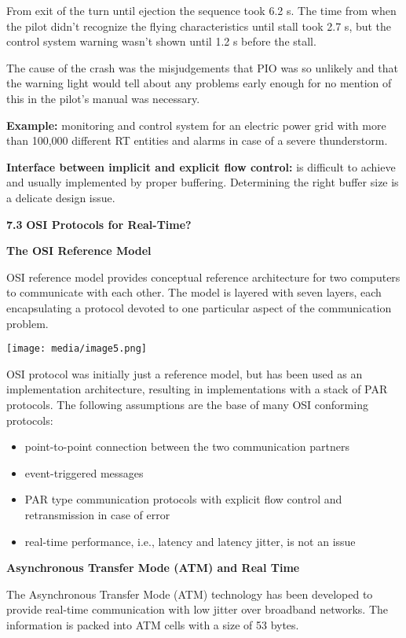 From exit of the turn until ejection the sequence took 6.2 s. The time
from when the pilot didn't recognize the flying characteristics until
stall took 2.7 s, but the control system warning wasn't shown until 1.2
s before the stall.

The cause of the crash was the misjudgements that PIO was so unlikely
and that the warning light would tell about any problems early enough
for no mention of this in the pilot's manual was necessary.

\textbf{Example:} monitoring and control system for an electric power
grid with more than 100,000 different RT entities and alarms in case of
a severe thunderstorm.

\textbf{Interface between implicit and explicit flow control:} is
difficult to achieve and usually implemented by proper buffering.
Determining the right buffer size is a delicate design issue.

\textbf{7.3} \protect\hypertarget{teil4}{}{}\textbf{OSI Protocols for
Real-Time? }

\textbf{The OSI Reference Model}

OSI reference model provides conceptual reference architecture for two
computers to communicate with each other. The model is layered with
seven layers, each encapsulating a protocol devoted to one particular
aspect of the communication problem.

\texttt{[image: media/image5.png]}

OSI protocol was initially just a reference model, but has been used as
an implementation architecture, resulting in implementations with a
stack of PAR protocols. The following assumptions are the base of many
OSI conforming protocols:

\begin{itemize}
\item
  point-to-point connection between the two communication partners
\item
  event-triggered messages
\item
  PAR type communication protocols with explicit flow control and
  retransmission in case of error
\item
  real-time performance, i.e., latency and latency jitter, is not an
  issue
\end{itemize}

\textbf{Asynchronous Transfer Mode (ATM) and Real Time}

The Asynchronous Transfer Mode (ATM) technology has been developed to
provide real-time communication with low jitter over broadband networks.
The information is packed into ATM cells with a size of 53 bytes.

